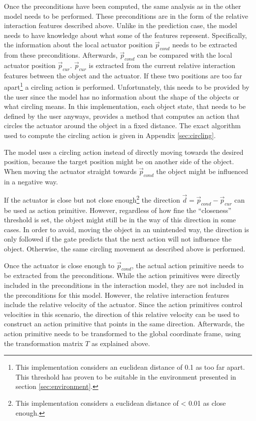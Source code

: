 Once the preconditions have been computed, the same analysis as in the other model needs to be performed. These preconditions are in the form of the relative interaction features described above.
Unlike in the prediction case, the model needs to have knowledge about what some of the features represent. Specifically, the information about the local actuator position $\vec{p}_{cond}$ needs to be extracted from these preconditions. Afterwards, $\vec{p}_{cond}$ can be compared with the local actuator position $\vec{p}_{cur}$. $\vec{p}_{cur}$ is extracted from the current relative interaction features between the object and the actuator. 
If these two positions are too far apart\footnote{This implementation considers an euclidean distance of 0.1 as too far apart. This threshold has proven to be suitable in the environment presented in section \ref{sec:environment}.} a circling action is performed. Unfortunately, this needs to be provided by the user since the model has no information about the shape of the objects or what circling means. In this implementation, each object state, that needs to be defined by the user anyways, provides a method that computes an action that circles the actuator around the object in a fixed distance.
The exact algorithm used to compute the circling action is given in Appendix \ref{sec:circling}.

The model uses a circling action instead of directly moving towards the desired position, because the target position might be on another side of the object. When moving the actuator straight towards $\vec{p}_{cond}$ the object might be influenced in a negative way.

If the actuator is close but not close enough\footnote{This implementation considers a euclidean distance of < 0.01 as close enough.} the direction $\vec{d} = \vec{p}_{cond} - \vec{p}_{cur}$ can be used as action primitive.
However, regardless of how fine the \enquote{closeness} threshold is set, the object might still be in the way of this direction in some cases. In order to avoid, moving the object in an unintended way, the direction is only followed if the gate predicts that the next action will not influence the object. Otherwise, the same circling movement as described above is performed.

Once the actuator is close enough to $\vec{p}_{cond}$, the actual action primitive needs to be extracted from the preconditions. 
While the action primitives were directly included in the preconditions in the interaction model, they are not included in the preconditions for this model. 
However, the relative interaction features include the relative velocity of the actuator. 
Since the action primitives control velocities in this scenario, the direction of this relative velocity can be used to construct an action primitive that points in the same direction. Afterwards, the action primitive needs to be transformed to the global coordinate frame, using the transformation matrix $T$ as explained above.

